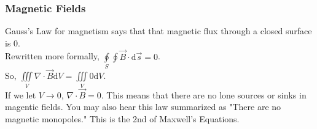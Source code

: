 \subsubsection{Magnetic Fields}
\noindent
Gauss's Law for magnetism says that that magnetic flux through a closed surface is 0.\\
Rewritten more formally, $\oint\limits_{S}\oint{\vec{B}\cdot\mathrm{d}\vec{s}}=0$.\\
So, $\iiint\limits_{V}{\nabla\cdot\vec{B}\mathrm{d}V}=\iiint\limits_{V}{0\mathrm{d}V}$.\\
If we let $V\to 0$, $\nabla\cdot\vec{B}=0$. This means that there are no lone sources or sinks in magentic fields. You may also hear this law summarized as "There are no magnetic monopoles." This is the 2nd of Maxwell's Equations.